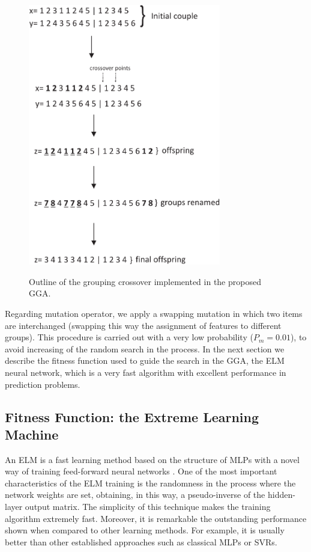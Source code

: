 \begin{figure}[b]
\centering
\includegraphics[width=0.75\textwidth]{Figures/cruce_GGA.pdf} \\
\caption{\label{cruce_GGA} Outline of the grouping crossover implemented in the proposed GGA.}
\end{figure}

Regarding mutation operator, we apply a swapping mutation in which two items are interchanged (swapping this way the assignment of features to different groups). This procedure is carried out with a very low probability ($P_m=0.01$), to avoid increasing of the random search in the process. In the next section we describe the fitness function used to guide the search in the GGA, the ELM neural network, which is a very fast algorithm with excellent performance in prediction problems.

\subsection{Fitness Function: the Extreme Learning Machine}
An ELM is a fast learning method based on the structure of MLPs with a novel way of training feed-forward neural networks \citep{huang2006extreme}. One of the most important characteristics of the ELM training is the randomness in the process where the network weights are set, obtaining, in this way, a pseudo-inverse of the hidden-layer output matrix. The simplicity of this technique makes the training algorithm extremely fast. Moreover, it is remarkable the outstanding performance shown when compared to other learning methods. For example, it is usually better than other established approaches such as classical MLPs or SVRs.

